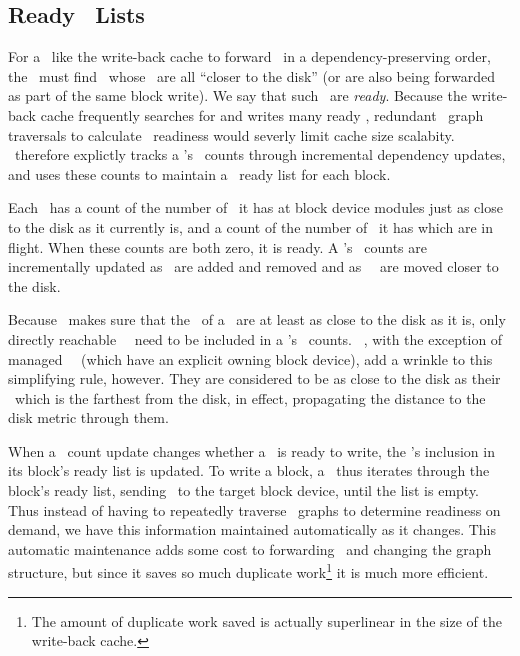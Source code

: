 \subsection{Ready \ChDesc\ Lists}

For a \module\ like the write-back cache to forward \chdescs\ in a
dependency-preserving order, the \module\ must find \chdescs\ whose \befores\
are all ``closer to the disk'' (or are also being forwarded as part of the same
block write). We say that such \chdescs\ are \emph{ready}. Because the
write-back cache frequently searches for and writes many ready \chdescs,
redundant \chdesc\ graph traversals to calculate \chdesc\ readiness would
severly limit cache size scalabity. \Kudos\ therefore explictly tracks a
\chdesc's \before\ counts through incremental dependency updates, and uses these
counts to maintain a \chdesc\ ready list for each block.

Each \chdesc\ has a count of the number of \befores\ it has at block device
modules just as close to the disk as it currently is, and a count of the number
of \befores\ it has which are in flight. When these counts are both zero, it is
ready. A \chdesc's \before\ counts are incrementally updated as \befores\ are
added and removed and as \beforing\ \chdescs\ are moved closer to the disk.

Because \Kudos\ makes sure that the \befores\ of a \chdesc\ are at least as
close to the disk as it is, only directly reachable \beforing\ \chdescs\ need to
be included in a \chdesc's \before\ counts. \Noop\ \chdescs, with the exception
of managed \noop\ \chdescs\ (which have an explicit owning block device), add a
wrinkle to this simplifying rule, however. They are considered to be as close to
the disk as their \before\ which is the farthest from the disk, in effect,
propagating the distance to the disk metric through them.

When a \before\ count update changes whether a \chdesc\ is ready to write, the
\chdesc's inclusion in its block's ready list is updated. To write a block, a
\module\ thus iterates through the block's ready list, sending \chdescs\ to the
target block device, until the list is empty. Thus instead of having to
repeatedly traverse \chdesc\ graphs to determine readiness on demand, we have
this information maintained automatically as it changes. This automatic
maintenance adds some cost to forwarding \chdescs\ and changing the graph
structure, but since it saves so much duplicate work\footnote{The amount of
duplicate work saved is actually superlinear in the size of the write-back
cache.} it is much more efficient.
